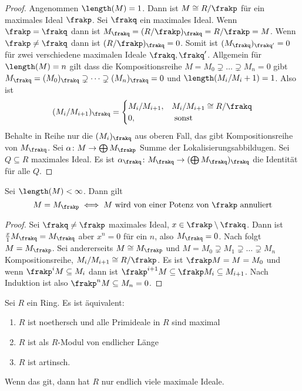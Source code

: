 \begin{proof}
	Angenommen \(\length(M)=1\). Dann ist \(M\cong R/\frakp\) für ein maximales Ideal \(\frakp\). Sei \(\frakq\) ein maximales Ideal. Wenn \(\frakp=\frakq\) dann ist \(M_\frakq=(R/\frakp)_\frakq=R/\frakp=M\).
	Wenn \(\frakp\neq\frakq\) dann ist \((R/\frakp)_\frakq=0\). Somit ist \((M_\frakq)_{\frakq'}=0\) für zwei verschiedene maximalen Ideale \(\frakq,\frakq'\).
	Allgemein für \(\length(M)=n\) gilt dass die Kompositionsreihe \(M=M_0\supsetneq \dots\supsetneq M_n=0\) gibt \(M_\frakq=(M_0)_\frakq\supsetneq \dots\supsetneq (M_n)_\frakq=0\) und \(\length(M_i/M_i+1)=1\). Also ist 
	\[(M_i/M_{i+1})_\frakq=\begin{cases}
		M_i/M_{i+1}, & M_i/M_{i+1}\cong R/\frakq\\
		0 , &\text{ sonst}
	\end{cases}\]
	Behalte in Reihe nur die \((M_i)_\frakq\) aus oberen Fall, das gibt Kompositionsreihe von \(M_\frakq\).
	Sei \(\alpha\colon M\to \bigoplus M_\frakp\) Summe der Lokalisierungsabbildugen. Sei \(Q\subseteq R\) maximales Ideal. Es ist \(\alpha_\frakq\colon M_\frakq\to (\bigoplus M_\frakq)_\frakq\) die Identität für alle \(Q\).
\end{proof}
\begin{Satz}
	Sei \(\length(M)<\infty\). Dann gilt
	\[M=M_\frakp\iff M\text{ wird von einer Potenz von \(\frakp\) annuliert}\]
\end{Satz}
\begin{proof}
	Sei \(\frakq\neq\frakp\) maximales Ideal, \(x\in\frakp\setminus\frakq\). Dann ist \(\frac x 1 M_\frakq=M_\frakq\) aber \(x^n=0\) für ein \(n\), also \(M_\frakq=0\).
	Nach  folgt \(M=M_\frakp\).
	Sei andererseits \(M\cong M_\frakp\) und \(M=M_0\supsetneq M_1\supsetneq \dots \supsetneq M_n\) Kompositionsreihe, \(M_i/M_{i+1}\cong R/\frakp\). Es ist \(\frakp M=M=M_0\) und wenn \(\frakp^iM\subseteq M_i\) dann ist \(\frakp^{i+1}M\subseteq \frakp M_i\subseteq M_{i+1}\). Nach Induktion ist also \(\frakp^nM\subseteq M_n=0\).
\end{proof}
\begin{Satz}\label{Satz:ArtinRingEndlLen}
	Sei \(R\) ein Ring. Es ist äquivalent:
	\begin{enumerate}
		\item \(R\) ist noethersch und alle Primideale in \(R\) sind maximal
		\item \(R\) ist als \(R\)-Modul von endlicher Länge
		\item \(R\) ist artinsch.
	\end{enumerate}
	Wenn das git, dann hat \(R\) nur endlich viele maximale Ideale.
\end{Satz}

